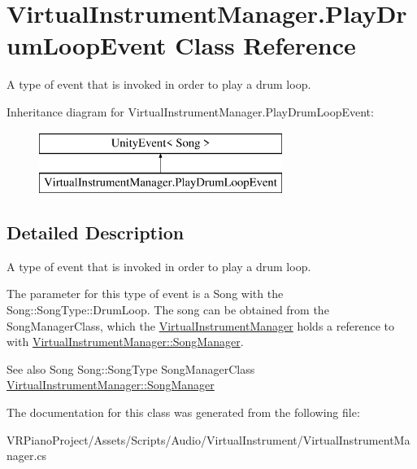 \hypertarget{class_virtual_instrument_manager_1_1_play_drum_loop_event}{}\section{Virtual\+Instrument\+Manager.\+Play\+Drum\+Loop\+Event Class Reference}
\label{class_virtual_instrument_manager_1_1_play_drum_loop_event}


A type of event that is invoked in order to play a drum loop.  


Inheritance diagram for Virtual\+Instrument\+Manager.\+Play\+Drum\+Loop\+Event\+:\begin{figure}[H]
\begin{center}
\leavevmode
\includegraphics[height=2.000000cm]{class_virtual_instrument_manager_1_1_play_drum_loop_event}
\end{center}
\end{figure}


\subsection{Detailed Description}
A type of event that is invoked in order to play a drum loop. 

The parameter for this type of event is a Song with the Song\+::\+Song\+Type\+::\+Drum\+Loop. The song can be obtained from the Song\+Manager\+Class, which the \hyperlink{class_virtual_instrument_manager}{Virtual\+Instrument\+Manager} holds a reference to with \hyperlink{class_virtual_instrument_manager_a33dae94932c10c66db76a0eebec76b01}{Virtual\+Instrument\+Manager\+::\+Song\+Manager}.

\begin{DoxySeeAlso}{See also}
Song Song\+::\+Song\+Type Song\+Manager\+Class \hyperlink{class_virtual_instrument_manager_a33dae94932c10c66db76a0eebec76b01}{Virtual\+Instrument\+Manager\+::\+Song\+Manager} 
\end{DoxySeeAlso}


The documentation for this class was generated from the following file\+:\begin{DoxyCompactItemize}
\item 
V\+R\+Piano\+Project/\+Assets/\+Scripts/\+Audio/\+Virtual\+Instrument/Virtual\+Instrument\+Manager.\+cs\end{DoxyCompactItemize}
